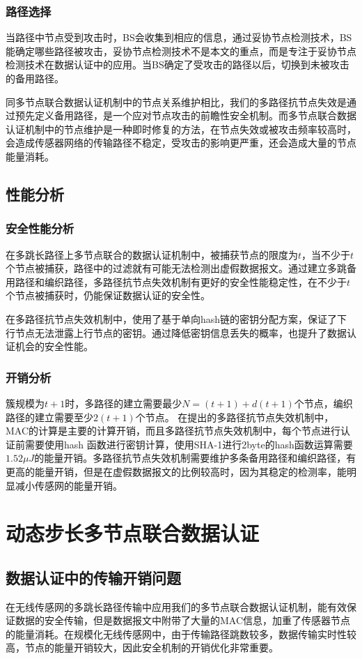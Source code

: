 \subsubsection{路径选择}
当路径中节点受到攻击时，BS会收集到相应的信息，通过妥协节点检测技术，BS能确定哪些路径被攻击，妥协节点检测技术不是本文的重点，而是专注于妥协节点检测技术在数据认证中的应用。当BS确定了受攻击的路径以后，切换到未被攻击的备用路径。

同多节点联合数据认证机制中的节点关系维护相比，我们的多路径抗节点失效是通过预先定义备用路径，是一个应对节点攻击的前瞻性安全机制。而多节点联合数据认证机制中的节点维护是一种即时修复的方法，在节点失效或被攻击频率较高时，会造成传感器网络的传输路径不稳定，受攻击的影响更严重，还会造成大量的节点能量消耗。
\subsection{性能分析}
\subsubsection{安全性能分析}
在多跳长路径上多节点联合的数据认证机制中，被捕获节点的限度为$t$，当不少于$t$个节点被捕获，路径中的过滤就有可能无法检测出虚假数据报文。通过建立多跳备用路径和编织路径，多路径抗节点失效机制有更好的安全性能稳定性，在不少于$t$个节点被捕获时，仍能保证数据认证的安全性。

在多路径抗节点失效机制中，使用了基于单向hash链的密钥分配方案，保证了下行节点无法泄露上行节点的密钥。通过降低密钥信息丢失的概率，也提升了数据认证机会的安全性能。
\subsubsection{开销分析}
簇规模为$t+1$时，多路径的建立需要最少$N=(t+1)+d(t+1)$个节点，编织路径的建立需要至少$2(t+1)$个节点。
在提出的多路径抗节点失效机制中，MAC的计算是主要的计算开销，而且多路径抗节点失效机制中，每个节点进行认证前需要使用hash 函数进行密钥计算，使用SHA-1进行2byte的hash函数运算需要$1.52 \mu J$的能量开销。多路径抗节点失效机制需要维护多条备用路径和编织路径，有更高的能量开销，但是在虚假数据报文的比例较高时，因为其稳定的检测率，能明显减小传感网的能量开销。

\section{动态步长多节点联合数据认证}
\subsection{数据认证中的传输开销问题}
在无线传感网的多跳长路径传输中应用我们的多节点联合数据认证机制，能有效保证数据的安全传输，但是数据报文中附带了大量的MAC信息，加重了传感器节点的能量消耗。在规模化无线传感网中，由于传输路径跳数较多，数据传输实时性较高，节点的能量开销较大，因此安全机制的开销优化非常重要。

